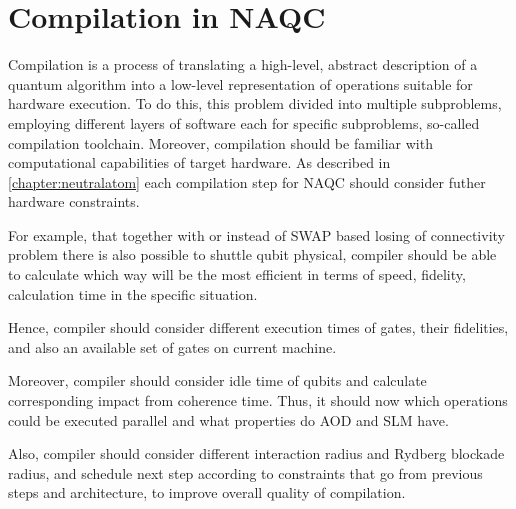 
\chapter{Compilation in \ac{NAQC}}\label{chapter:compilation}
Compilation is a process of translating a high-level, 
abstract description of a quantum algorithm into a low-level representation of operations suitable for hardware execution.
To do this, this problem divided into multiple subproblems, 
employing different layers of software each for specific subproblems, so-called compilation toolchain.
Moreover, compilation should be familiar with computational capabilities of target hardware.
As described in \ref{chapter:neutralatom} each compilation step for \ac{NAQC} should consider futher hardware constraints.

For example, that together with or instead of SWAP based losing of connectivity problem
there is also possible to shuttle qubit physical, 
compiler should be able to calculate which way will be the most efficient in terms of speed, fidelity, calculation time in the specific situation.

Hence, compiler should consider different execution times of gates, their fidelities, 
and also an available set of gates on current machine.

Moreover, compiler should consider idle time of qubits and calculate corresponding impact from coherence time.
Thus, it should now which operations could be executed parallel and what properties do \ac{AOD} and \ac{SLM} have.

Also, compiler should consider different interaction radius and Rydberg blockade radius, 
and schedule next step according to constraints that go from previous steps and architecture, 
to improve overall quality of compilation.
\parencite{Tan_2025_Enola,Schmid_2024_NeutralAtomBasics}

